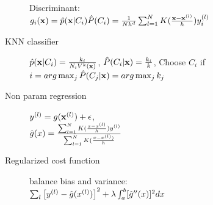 \begin{description}
        Discriminant: \\$g_i(\mathbf{x}) = \hat{p}(\mathbf{x}|C_i)\hat{P}(C_i) =
        \frac{1}{Nh^d}\sum_{l=1}^N K(\frac{\mathbf{x}-\mathbf{x}^{(l)}}{h})y^{(l)}_i$
    \item[KNN classifier] $\hat{p}(\mathbf{x}|C_i) = \frac{k_i}{N_iV^k(\mathbf{x})}$,
        $\hat{P}(C_i|\mathbf{x}) = \frac{k_i}{k}$, Choose $C_i$ if $i=arg
        \max_j\hat{P}(C_j|\mathbf{x}) = arg \max_j k_j$
    \item[Non param regression] $y^{(l)}=g(\mathbf{x}^{(l)})+\epsilon$, \\ $\hat{g}(x) = \frac{\sum_{l=1}^N
            K(\frac{x-x^{(l)}}{h})y^{(l)}}{\sum_{l=1}^N K(\frac{x-x^{(l)})}{h}}$
        \item[Regularized cost function] balance bias and variance:\\$\sum_l\left[ y^{(l)}-\hat{g}(x^{(l)})
            \right]^2+\lambda\int^b_a [\hat{g}''(x)]^2 dx$
\end{description}
